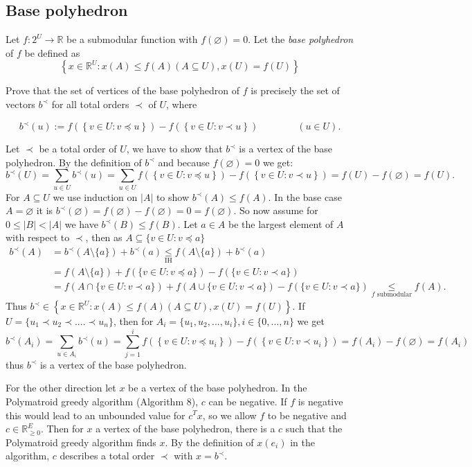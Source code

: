 \documentclass{article}
\let\emptyset\varnothing
\newcommand{\R}{\mathbb{R}}
\begin{document}
  \subsection{Base polyhedron}
  \begin{centerframebox}
    Let $f : 2^U \to \R$ be a submodular function with $f(\emptyset) = 0$.
    Let the \textit{base polyhedron} of $f$ be defined as
    \[ \left\{ x\in \R^{U} : x(A) \leq f(A) (A\subseteq U), x(U) = f(U)\right\} \]

    Prove that the set of vertices of the base polyhedron of $f$ is precisely the set of
    vectors $b^\prec$ for all total orders $\prec$ of $U$, where

    \[ b^\prec(u) := f\left(\left\{v\in U: v\preceq u\right\}\right) - f\left(\left\{v\in U: v\prec u\right\}\right) \qquad\qquad (u\in U). \]
  \end{centerframebox}
Let $\prec$ be a total order of $U$, we have to show that $b^\prec$ is a vertex of the base polyhedron.
By the definition of $b^\prec$ and because $f(\emptyset) = 0$ we get:
\[b^\prec(U)=\sum_{u\in U}b^\prec(u)=\sum_{u\in U}f\left(\left\{v\in U: v\preceq u\right\}\right) - f\left(\left\{v\in U: v\prec u\right\}\right)=f(U)-f(\emptyset)=f(U).\]
For $A\subseteq U$ we use induction on $|A|$ to show $b^\prec(A) \leq f(A)$. In the base case $A=\emptyset$ it is $b^\prec(\emptyset)=f(\emptyset)-f(\emptyset)=0=f(\emptyset)$. So now assume for $0\leq|B|<|A|$ we have $b^\prec(B) \leq f(B)$. Let $a\in A$ be the largest element of $A$ with respect to $\prec$, then as $A\subseteq \{v\in U: v\preceq a\}$
\begin{align*}b^\prec(A)&=b^\prec(A\setminus\{a\})+b^\prec(a)\underset{\text{IH}}\leq f(A\setminus\{a\})+b^\prec(a)\\
&=f(A\setminus\{a\})+f(\{v\in U: v\preceq a\}) - f(\{v\in U: v\prec a\})\\
&= f(A\cap \{v\in U: v\prec a\})+f(A\cup \{v\in U: v\prec a\}) - f(\{v\in U: v\prec a\})\underset{f\text{ submodular}}{\leq} f(A).
\end{align*}
Thus $b^\prec\in\left\{ x\in \R^{U} : x(A) \leq f(A) (A\subseteq U), x(U) = f(U)\right\} $.
If $U=\{u_1\prec u_2\prec....\prec u_n\}$, then for $A_i=\{u_1,u_2,...,u_i\}, i\in \{0,...,n\}$ we get \[b^\prec(A_i)=\sum_{u\in A_i}b^\prec(u)=\sum_{j=1}^i f\left(\left\{v\in U: v\preceq u_i\right\}\right) - f\left(\left\{v\in U: v\prec u_i\right\}\right)=f(A_i)-f(\emptyset)=f(A_i)\]
thus $b^\prec$ is a vertex of the base polyhedron.

For the other direction let $x$ be a vertex of the base polyhedron. In the Polymatroid greedy algorithm (Algorithm 8), $c$ can be negative. If $f$ is negative this would lead to an unbounded value for $c^Tx$, so we allow $f$ to be negative and $c\in\mathbb R_{\geq 0}^E$. Then for $x$ a vertex of the base polyhedron, there is a $c$ such that the Polymatroid greedy algorithm finds $x$. By the definition of $x(e_i)$ in the algorithm, $c$ describes a total order $\prec$ with $x=b^\prec$.
\end{document}
